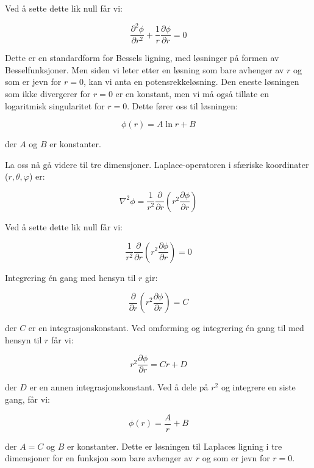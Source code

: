 Ved å sette dette lik null får vi:

\begin{equation*}
\frac{\partial^2 \phi}{\partial r^2} + \frac{1}{r} \frac{\partial \phi}{\partial r} = 0
\end{equation*}

Dette er en standardform for Bessels ligning, med løsninger på formen av Besselfunksjoner. Men siden vi leter etter en løsning som bare avhenger av $r$ og som er jevn for $r=0$, kan vi anta en potensrekkeløsning. Den eneste løsningen som ikke divergerer for $r=0$ er en konstant, men vi må også tillate en logaritmisk singularitet for $r=0$. Dette fører oss til løsningen:

\begin{equation*}
\phi(r) = A \ln r + B
\end{equation*}

der $A$ og $B$ er konstanter.

La oss nå gå videre til tre dimensjoner. Laplace-operatoren i sfæriske koordinater ($r, \theta, \varphi$) er:

\begin{equation*}
\nabla^2 \phi = \frac{1}{r^2} \frac{\partial}{\partial r} \left(r^2 \frac{\partial \phi}{\partial r} \right)
\end{equation*}

Ved å sette dette lik null får vi:

\begin{equation*}
\frac{1}{r^2} \frac{\partial}{\partial r} \left(r^2 \frac{\partial \phi}{\partial r} \right) = 0
\end{equation*}

Integrering én gang med hensyn til $r$ gir:

\begin{equation*}
\frac{\partial}{\partial r} \left(r^2 \frac{\partial \phi}{\partial r} \right) = C
\end{equation*}

der $C$ er en integrasjonskonstant. Ved omforming og integrering én gang til med hensyn til $r$ får vi:

\begin{equation*}
r^2 \frac{\partial \phi}{\partial r} = Cr + D
\end{equation*}

der $D$ er en annen integrasjonskonstant. Ved å dele på $r^2$ og integrere en siste gang, får vi:

\begin{equation*}
\phi(r) = \frac{A}{r} + B
\end{equation*}

der $A=C$ og $B$ er konstanter. Dette er løsningen til Laplaces ligning i tre dimensjoner for en funksjon som bare avhenger av $r$ og som er jevn for $r=0$.